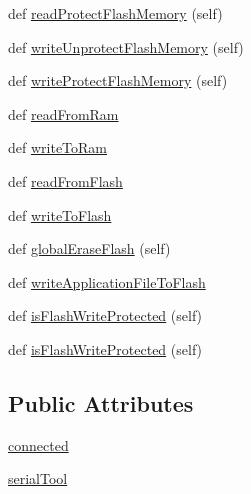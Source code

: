 \begin{DoxyCompactItemize}
\item 
def \hyperlink{classstm__tools_1_1serialflasher_1_1stmdevice_1_1STMInterface_ad11572f8cdfd15fafda57063c7bf39fd}{read\+Protect\+Flash\+Memory} (self)
\item 
def \hyperlink{classstm__tools_1_1serialflasher_1_1stmdevice_1_1STMInterface_ace9ab600da0e18109b3f7812ea9789b0}{write\+Unprotect\+Flash\+Memory} (self)
\item 
def \hyperlink{classstm__tools_1_1serialflasher_1_1stmdevice_1_1STMInterface_a8608d7abc8ea2880c6dc70e921a03a63}{write\+Protect\+Flash\+Memory} (self)
\item 
def \hyperlink{classstm__tools_1_1serialflasher_1_1stmdevice_1_1STMInterface_ac7f89ebbb29fb2eac15a05c9bdbf993a}{read\+From\+Ram}
\item 
def \hyperlink{classstm__tools_1_1serialflasher_1_1stmdevice_1_1STMInterface_af98ea93434346abf85292e1d21ed272e}{write\+To\+Ram}
\item 
def \hyperlink{classstm__tools_1_1serialflasher_1_1stmdevice_1_1STMInterface_a1c110b16ded5bc4d637df007477069cb}{read\+From\+Flash}
\item 
def \hyperlink{classstm__tools_1_1serialflasher_1_1stmdevice_1_1STMInterface_aa1c44efc046b984931f15a7c79132474}{write\+To\+Flash}
\item 
def \hyperlink{classstm__tools_1_1serialflasher_1_1stmdevice_1_1STMInterface_a3ec697c56dd144f4fe478d89ac0ba657}{global\+Erase\+Flash} (self)
\item 
def \hyperlink{classstm__tools_1_1serialflasher_1_1stmdevice_1_1STMInterface_a82b19b0b7a516f3e2c578edcc860fdb7}{write\+Application\+File\+To\+Flash}
\item 
def \hyperlink{classstm__tools_1_1serialflasher_1_1stmdevice_1_1STMInterface_a3294094a1eb36f4d11aef9a3a04a54f9}{is\+Flash\+Write\+Protected} (self)
\item 
def \hyperlink{classstm__tools_1_1serialflasher_1_1stmdevice_1_1STMInterface_a3294094a1eb36f4d11aef9a3a04a54f9}{is\+Flash\+Write\+Protected} (self)
\end{DoxyCompactItemize}
\subsection*{Public Attributes}
\begin{DoxyCompactItemize}
\item 
\hyperlink{classstm__tools_1_1serialflasher_1_1stmdevice_1_1STMInterface_a0d28f70b9b7238e7de23f1128d858d39}{connected}
\item 
\hyperlink{classstm__tools_1_1serialflasher_1_1stmdevice_1_1STMInterface_a6a69f797b7e3f4399dbd0a52f09a007a}{serial\+Tool}
\end{DoxyCompactItemize}
